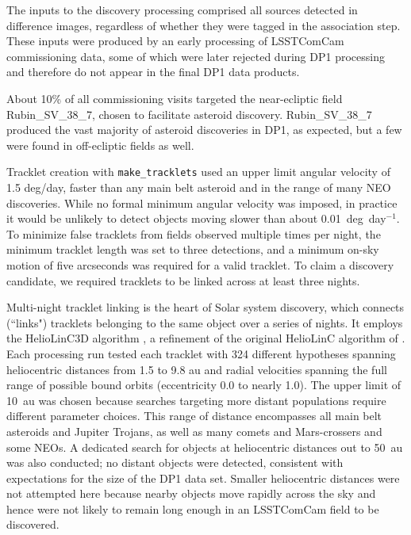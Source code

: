 The inputs to the discovery processing comprised all sources detected in difference images, regardless of whether they were tagged in the association step.
These inputs were produced by an early processing of \gls{LSSTComCam} commissioning data, some of which were later rejected during \gls{DP1} processing and therefore do not appear in the final \gls{DP1} data products.

About 10\% of all commissioning visits targeted the near-ecliptic field Rubin\_SV\_38\_7, chosen to facilitate asteroid discovery.
Rubin\_SV\_38\_7 produced the vast majority of asteroid discoveries in \gls{DP1}, as expected, but a few were found in off-ecliptic fields as well.

Tracklet creation with \texttt{make\_tracklets} used an upper limit angular velocity of 1.5 \gls{deg}/day, faster than any main belt asteroid and in the range of many \gls{NEO} discoveries.
While no formal minimum angular velocity was imposed, in practice it would be unlikely to detect objects moving slower  than about 0.01~deg~day$^{-1}$.
To minimize false \gls{tracklet}s from fields observed multiple times per night, the minimum \gls{tracklet} length was set to three detections, and a minimum on-sky motion of five arcseconds was required for a valid \gls{tracklet}.
To claim a discovery candidate, we required tracklets to be linked across at least three nights.

Multi-night \gls{tracklet} linking is the heart of Solar system discovery,  which connects (``links") tracklets belonging to the same object over a series of nights.
It employs the HelioLinC3D algorithm \citep{2020DPS....5221101E,2022DPS....5450404H}, a refinement of the original HelioLinC algorithm of \citet{2018AJ....156..135H}.
Each processing run tested each \gls{tracklet} with 324 different hypotheses spanning heliocentric distances from 1.5 to 9.8 \gls{au} and radial velocities spanning the full range of possible bound orbits (eccentricity 0.0 to nearly 1.0).
The upper limit of 10~\gls{au} was chosen because searches targeting more distant populations require different parameter choices.
This range of distance encompasses all main belt asteroids and Jupiter Trojans, as well as many comets and Mars-crossers and some \glspl{NEO}.
A dedicated search for objects at heliocentric distances out to 50~\gls{au} was also conducted; no distant objects were detected, consistent with expectations for the size of the \gls{DP1} data set.
Smaller heliocentric distances were not attempted here because nearby objects move rapidly across the sky and hence were not likely to remain long enough in an \gls{LSSTComCam} field to be discovered.

